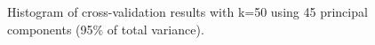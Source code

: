 \documentclass[paper=a4, fontsize=11pt]{scrartcl} %
\begin{document}
\begin{figure}[h]
    \centering
    \caption{Histogram of cross-validation results with k=50 using 45 principal components (95\% of total variance).}
    \label{fig:hist_m}
\end{figure}




\begin{flushleft}
\end{flushleft}

\begin{flushleft}
\end{flushleft}
\end{document}
